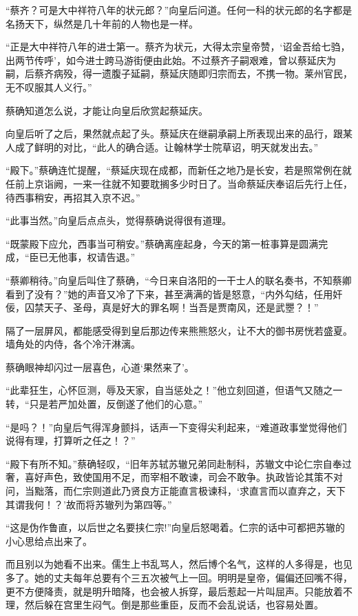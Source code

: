 “蔡齐？可是大中祥符八年的状元郎？”向皇后问道。任何一科的状元郎的名字都是名扬天下，纵然是几十年前的人物也是一样。

“正是大中祥符八年的进士第一。蔡齐为状元，大得太宗皇帝赞，‘诏金吾给七驺，出两节传呼’，如今进士跨马游街便由此始。不过蔡齐子嗣艰难，曾以蔡延庆为嗣，后蔡齐病殁，得一遗腹子延嗣，蔡延庆随即归宗而去，不携一物。莱州官民，无不叹服其人义行。”

蔡确知道怎么说，才能让向皇后欣赏起蔡延庆。

向皇后听了之后，果然就点起了头。蔡延庆在继嗣承嗣上所表现出来的品行，跟某人成了鲜明的对比，“此人的确合适。让翰林学士院草诏，明天就发出去。”

“殿下。”蔡确连忙提醒，“蔡延庆现在成都，而新任之地乃是长安，若是照常例在就任前上京诣阙，一来一往就不知要耽搁多少时日了。当命蔡延庆奉诏后先行上任，待西事稍安，再招其入京不迟。”

“此事当然。”向皇后点点头，觉得蔡确说得很有道理。

“既蒙殿下应允，西事当可稍安。”蔡确离座起身，今天的第一桩事算是圆满完成，“臣已无他事，权请告退。”

“蔡卿稍待。”向皇后叫住了蔡确，“今日来自洛阳的一干士人的联名奏书，不知蔡卿看到了没有？”她的声音又冷了下来，甚至满满的皆是怒意，“内外勾结，任用奸佞，囚禁天子、圣母，真是好大的罪名啊！当吾是贾南风，还是武瞾？！”

隔了一层屏风，都能感受得到皇后那边传来熊熊怒火，让不大的御书房恍若盛夏。墙角处的内侍，各个冷汗淋漓。

蔡确眼神却闪过一层喜色，心道‘果然来了’。

“此辈狂生，心怀叵测，辱及天家，自当惩处之！”他立刻回道，但语气又随之一转，“只是若严加处置，反倒遂了他们的心意。”

“是吗？！”向皇后气得浑身颤抖，话声一下变得尖利起来，“难道政事堂觉得他们说得有理，打算听之任之！？”

“殿下有所不知。”蔡确轻叹，“旧年苏轼苏辙兄弟同赴制科，苏辙文中论仁宗自奉过奢，喜好声色，致使国用不足，而宰相不敢谏，司会不敢争。执政皆论其策不对问，当黜落，而仁宗则道此乃贤良方正能直言极谏科，‘求直言而以直弃之，天下其谓我何！？’故而将苏辙列为第四等。”

“这是伪作鲁直，以后世之名要挟仁宗!”向皇后怒喝着。仁宗的话中可都把苏辙的小心思给点出来了。

而且别以为她看不出来。儒生上书乱骂人，然后博个名气，这样的人多得是，也见多了。她的丈夫每年总要有个三五次被气上一回。明明是皇帝，偏偏还回嘴不得，更不方便降责，就是明升暗降，也会被人拆穿，最后惹起一片叫屈声。只能放着不理，然后躲在宫里生闷气。倒是那些重臣，反而不会乱说话，也容易处置。

